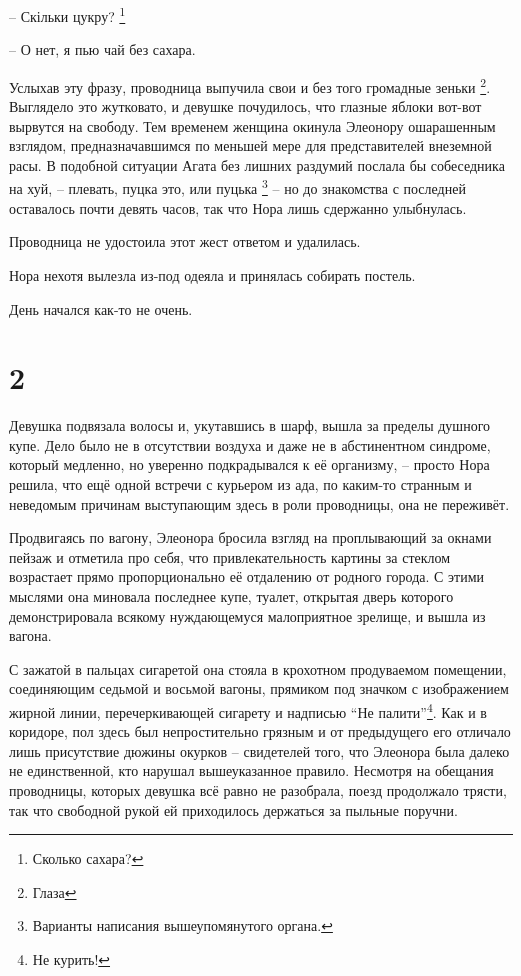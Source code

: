 \documentclass[
  a5paperpaper,
  DIV=11,
  numbers=noendperiod]{scrreprt}
\begin{document}
-- Скільки цукру? \footnote{Сколько сахара?}

-- О нет, я пью чай без сахара.

Услыхав эту фразу, проводница выпучила свои и без того громадные зеньки
\footnote{Глаза}. Выглядело это жутковато, и девушке почудилось, что
глазные яблоки вот-вот вырвутся на свободу. Тем временем женщина окинула
Элеонору ошарашенным взглядом, предназначавшимся по меньшей мере для
представителей внеземной расы. В подобной ситуации Агата без лишних
раздумий послала бы собеседника на хуй, -- плевать, пуцка это, или
пуцька \footnote{Варианты написания вышеупомянутого органа.} -- но до
знакомства с последней оставалось почти девять часов, так что Нора лишь
сдержанно улыбнулась.

Проводница не удостоила этот жест ответом и удалилась.

Нора нехотя вылезла из-под одеяла и принялась собирать постель.

День начался как-то не очень.

\section*{2}\label{2}


Девушка подвязала волосы и, укутавшись в шарф, вышла за пределы душного
купе. Дело было не в отсутствии воздуха и даже не в абстинентном
синдроме, который медленно, но уверенно подкрадывался к её организму, --
просто Нора решила, что ещё одной встречи с курьером из ада, по каким-то
странным и неведомым причинам выступающим здесь в роли проводницы, она
не переживёт.

Продвигаясь по вагону, Элеонора бросила взгляд на проплывающий за окнами
пейзаж и отметила про себя, что привлекательность картины за стеклом
возрастает прямо пропорционально её отдалению от родного города. С этими
мыслями она миновала последнее купе, туалет, открытая дверь которого
демонстрировала всякому нуждающемуся малоприятное зрелище, и вышла из
вагона.

С зажатой в пальцах сигаретой она стояла в крохотном продуваемом
помещении, соединяющим седьмой и восьмой вагоны, прямиком под значком с
изображением жирной линии, перечеркивающей сигарету и надписью ``Не
палити''\footnote{Не курить!}. Как и в коридоре, пол здесь был
непростительно грязным и от предыдущего его отличало лишь присутствие
дюжины окурков -- свидетелей того, что Элеонора была далеко не
единственной, кто нарушал вышеуказанное правило. Несмотря на обещания
проводницы, которых девушка всё равно не разобрала, поезд продолжало
трясти, так что свободной рукой ей приходилось держаться за пыльные
поручни.
\end{document}
